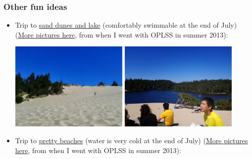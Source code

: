 \documentclass{article}
\begin{document}
\subsubsection*{Other fun ideas}
\begin{itemize}
  \item Trip to \href{https://maps.google.com/?ll=43.929565309931085,-124.11577032281491&q=43.929565309931085,-124.11577032281491}{sand dunes and lake} (comfortably swimmable at the end of July) (\href{https://plus.google.com/photos/103416070288920608429/albums/5905882242979530833/5905882882578571666?authkey=CNrZu8S0s6yvgQE&pid=5905882882578571666&oid=103416070288920608429}{More pictures here}, from when I went with OPLSS in summer 2013):
  \begin{center}
    \includegraphics[width=0.45\textwidth]{2013-07-28-15-30-37.jpg}
    \includegraphics[width=0.45\textwidth]{2013-07-28-15-30-53.jpg}
  \end{center}
  \item Trip to \href{https://maps.google.com/maps?q=44.134686,-124.123456&hl=en&sll=44.032101,-124.112077&sspn=0.288791,0.676346&t=h&dirflg=w&z=16}{pretty beaches} (water is very cold at the end of July) (\href{https://plus.google.com/photos/103416070288920608429/albums/5905882242979530833/5905893435660061586?authkey=CNrZu8S0s6yvgQE&pid=5905893435660061586&oid=103416070288920608429}{More pictures here}, from when I went with OPLSS in summer 2013):

\end{itemize}
\end{document}
